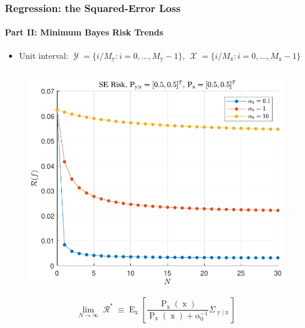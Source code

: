 \documentclass[aspectratio=169,usenames,dvipsnames]{beamer}
\DeclareMathOperator{\xrm}{\mathrm{x}}
\DeclareMathOperator{\yrm}{\mathrm{y}}
\DeclareMathOperator{\Prm}{\mathrm{P}}
\DeclareMathOperator{\Erm}{\mathrm{E}}
\DeclareMathOperator{\Xcal}{\mathcal{X}}
\DeclareMathOperator{\Ycal}{\mathcal{Y}}
\DeclareMathOperator{\Rcal}{\mathcal{R}}
\begin{document}
\begin{frame}
\frametitle{Regression: the Squared-Error Loss}
\framesubtitle{Part II: Minimum Bayes Risk Trends}

\begin{itemize}
\item Unit interval:  $\Ycal = \{ i/M_{\yrm} : i = 0,\ldots,M_{\yrm}-1 \}$, $\Xcal = \{ i/M_{\xrm} : i = 0,\ldots,M_{\xrm}-1 \}$
\end{itemize}

\begin{columns}[c]

\begin{column}{0.5\linewidth}
\begin{figure}
\centering
\includegraphics[width=0.9\linewidth]{Risk_SE_Dir_IO_N_leg_a0.pdf}
\end{figure}
%
\vspace{-0.25em}
\begin{equation*}
\lim_{N \to \infty} \Rcal^* \equiv \Erm_{\xrm} \left[ \frac{\Prm_{\xrm}(\xrm)}{\Prm_{\xrm}(\xrm) + \alpha_0^{-1}} \Sigma_{\yrm | \xrm} \right] 
\end{equation*}

\end{column}


\end{columns}
\end{frame}
\end{document}
